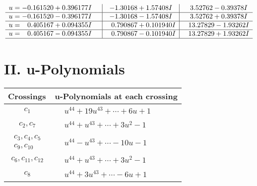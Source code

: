 \documentclass[1p]{elsarticle_modified}
\theoremstyle{definition}
\begin{document}
$$\begin{array}{c|c|c}
\begin{aligned}
u &= -0.161520 + 0.396177 I\end{aligned}
 & -1.30168 + 1.57408 I & \phantom{-}3.52762 - 0.39378 I \\ \hline\begin{aligned}
u &= -0.161520 - 0.396177 I\end{aligned}
 & -1.30168 - 1.57408 I & \phantom{-}3.52762 + 0.39378 I \\ \hline\begin{aligned}
u &= \phantom{-}0.405167 + 0.094355 I\end{aligned}
 & \phantom{-}0.790867 + 0.101940 I & \phantom{-}13.27829 - 1.93262 I \\ \hline\begin{aligned}
u &= \phantom{-}0.405167 - 0.094355 I\end{aligned}
 & \phantom{-}0.790867 - 0.101940 I & \phantom{-}13.27829 + 1.93262 I\\
 \hline 
 \end{array}$$\newpage
\newpage\renewcommand{\arraystretch}{1}
\centering \section*{ II. u-Polynomials}
\begin{tabular}{m{50pt}|m{274pt}}
Crossings & \hspace{64pt}u-Polynomials at each crossing \\
\hline $$\begin{aligned}c_{1}\end{aligned}$$&$\begin{aligned}
&u^{44}+19 u^{43}+\cdots+6 u+1
\end{aligned}$\\
\hline $$\begin{aligned}c_{2},c_{7}\end{aligned}$$&$\begin{aligned}
&u^{44}+u^{43}+\cdots+3 u^2-1
\end{aligned}$\\
\hline $$\begin{aligned}c_{3},c_{4},c_{5}\\c_{9},c_{10}\end{aligned}$$&$\begin{aligned}
&u^{44}- u^{43}+\cdots-10 u-1
\end{aligned}$\\
\hline $$\begin{aligned}c_{6},c_{11},c_{12}\end{aligned}$$&$\begin{aligned}
&u^{44}+u^{43}+\cdots+3 u^2-1
\end{aligned}$\\
\hline $$\begin{aligned}c_{8}\end{aligned}$$&$\begin{aligned}
&u^{44}+3 u^{43}+\cdots-6 u+1
\end{aligned}$\\
\hline
\end{tabular}\newpage\renewcommand{\arraystretch}{1}
\end{document}

